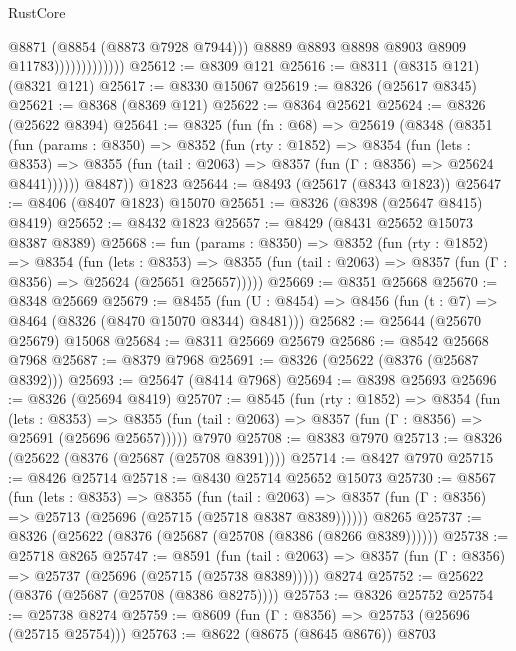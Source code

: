 \begin{lexlean}{RustCore}
\begin{coremodule}
                                @8871
                                (@8854 (@8873 @7928 @7944)))
                              @8889
                              @8893
                              @8898
                              @8903
                              @8909
                              @11783)))))))))))))
@25612 := @8309 @121
@25616 := @8311 (@8315 @121) (@8321 @121)
@25617 := @8330 @15067
@25619 := @8326 (@25617 @8345)
@25621 := @8368 (@8369 @121)
@25622 := @8364 @25621
@25624 := @8326 (@25622 @8394)
@25641 := @8325
    (fun (fn : @68) =>
    @25619
      (@8348
        (@8351
          (fun (params : @8350) =>
          @8352
            (fun (rty : @1852) =>
            @8354
              (fun (lets : @8353) =>
              @8355 (fun (tail : @2063) => @8357 (fun (Γ : @8356) => @25624 @8441))))))
        @8487))
    @1823
@25644 := @8493 (@25617 (@8343 @1823))
@25647 := @8406 (@8407 @1823) @15070
@25651 := @8326 (@8398 (@25647 @8415) @8419)
@25652 := @8432 @1823
@25657 := @8429 (@8431 @25652 @15073 @8387 @8389)
@25668 := fun (params : @8350) =>
  @8352
    (fun (rty : @1852) =>
    @8354
      (fun (lets : @8353) =>
      @8355 (fun (tail : @2063) => @8357 (fun (Γ : @8356) => @25624 (@25651 @25657)))))
@25669 := @8351 @25668
@25670 := @8348 @25669
@25679 := @8455
    (fun (U : @8454) => @8456 (fun (t : @7) => @8464 (@8326 (@8470 @15070 @8344) @8481)))
@25682 := @25644 (@25670 @25679) @15068
@25684 := @8311 @25669 @25679
@25686 := @8542 @25668 @7968
@25687 := @8379 @7968
@25691 := @8326 (@25622 (@8376 (@25687 @8392)))
@25693 := @25647 (@8414 @7968)
@25694 := @8398 @25693
@25696 := @8326 (@25694 @8419)
@25707 := @8545
    (fun (rty : @1852) =>
    @8354
      (fun (lets : @8353) =>
      @8355 (fun (tail : @2063) => @8357 (fun (Γ : @8356) => @25691 (@25696 @25657)))))
    @7970
@25708 := @8383 @7970
@25713 := @8326 (@25622 (@8376 (@25687 (@25708 @8391))))
@25714 := @8427 @7970
@25715 := @8426 @25714
@25718 := @8430 @25714 @25652 @15073
@25730 := @8567
    (fun (lets : @8353) =>
    @8355
      (fun (tail : @2063) =>
      @8357 (fun (Γ : @8356) => @25713 (@25696 (@25715 (@25718 @8387 @8389))))))
    @8265
@25737 := @8326 (@25622 (@8376 (@25687 (@25708 (@8386 (@8266 @8389))))))
@25738 := @25718 @8265
@25747 := @8591
    (fun (tail : @2063) => @8357 (fun (Γ : @8356) => @25737 (@25696 (@25715 (@25738 @8389)))))
    @8274
@25752 := @25622 (@8376 (@25687 (@25708 (@8386 @8275))))
@25753 := @8326 @25752
@25754 := @25738 @8274
@25759 := @8609 (fun (Γ : @8356) => @25753 (@25696 (@25715 @25754)))
@25763 := @8622 (@8675 (@8645 @8676)) @8703

\end{coremodule}
\end{lexlean}
